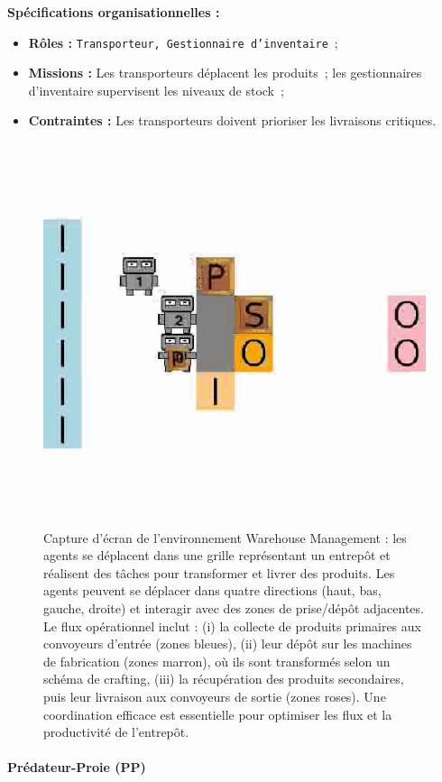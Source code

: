 \textbf{Spécifications organisationnelles :}
\begin{itemize}
    \item \textbf{Rôles :} \texttt{Transporteur, Gestionnaire d'inventaire}~;
    \item \textbf{Missions :} Les transporteurs déplacent les produits~; les gestionnaires d'inventaire supervisent les niveaux de stock~;
    \item \textbf{Contraintes :} Les transporteurs doivent prioriser les livraisons critiques.
\end{itemize}

\begin{figure}[h!]
    \centering
    \includegraphics[width=0.6\linewidth]{figures/wm.png}
    \caption{Capture d'écran de l'environnement Warehouse Management : les agents se déplacent dans une grille représentant un entrepôt et réalisent des tâches pour transformer et livrer des produits. Les agents peuvent se déplacer dans quatre directions (haut, bas, gauche, droite) et interagir avec des zones de prise/dépôt adjacentes. Le flux opérationnel inclut : (i) la collecte de produits primaires aux convoyeurs d'entrée (zones bleues), (ii) leur dépôt sur les machines de fabrication (zones marron), où ils sont transformés selon un schéma de crafting, (iii) la récupération des produits secondaires, puis leur livraison aux convoyeurs de sortie (zones roses). Une coordination efficace est essentielle pour optimiser les flux et la productivité de l'entrepôt.}
    \label{fig:warehouse}
\end{figure}

\paragraph{Prédateur-Proie (PP)}

